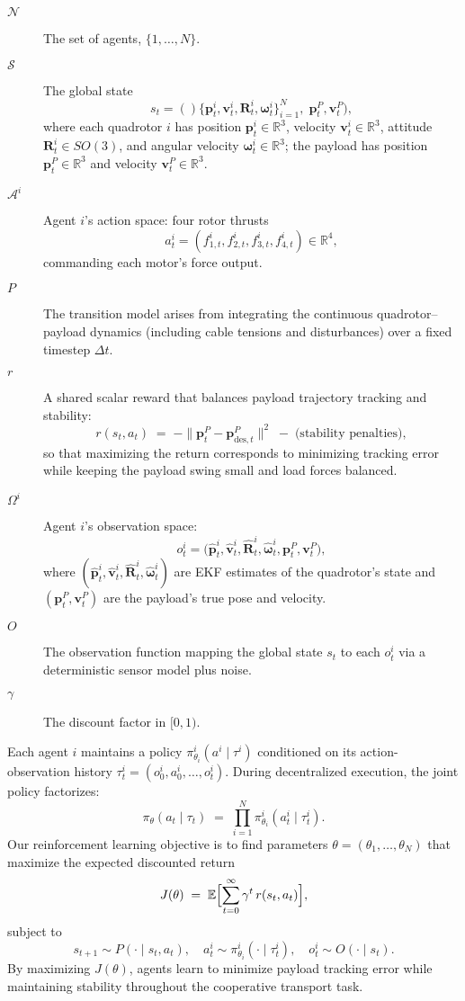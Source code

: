 \begin{description}
  \item[\(\mathcal{N}\)] The set of agents, \(\{1,\dots,N\}\).
  \item[\(\mathcal{S}\)] The global state 
  \[
    s_t = ()\bigl\{\mathbf{p}^i_t,\mathbf{v}^i_t,\mathbf{R}^i_t,\boldsymbol{\omega}^i_t\bigr\}_{i=1}^N,\;\mathbf{p}^P_t,\mathbf{v}^P_t),
  \]
  where each quadrotor \(i\) has position \(\mathbf{p}^i_t\in\mathbb{R}^3\), velocity \(\mathbf{v}^i_t\in\mathbb{R}^3\), attitude \(\mathbf{R}^i_t\in SO(3)\), and angular velocity \(\boldsymbol{\omega}^i_t\in\mathbb{R}^3\); the payload has position \(\mathbf{p}^P_t\in\mathbb{R}^3\) and velocity \(\mathbf{v}^P_t\in\mathbb{R}^3\).
  \item[\(\mathcal{A}^i\)] Agent \(i\)’s action space: four rotor thrusts 
  \[
    a^i_t = (f^i_{1,t},f^i_{2,t},f^i_{3,t},f^i_{4,t}) \in \mathbb{R}^4,
  \]
  commanding each motor’s force output.
  \item[\(P\)] The transition model arises from integrating the continuous quadrotor–payload dynamics (including cable tensions and disturbances) over a fixed timestep \(\Delta t\).
  \item[\(r\)] A shared scalar reward that balances payload trajectory tracking and stability:  
  \[
    r(s_t,a_t) \;=\; -\|\mathbf{p}^P_t - \mathbf{p}^P_{\mathrm{des},t}\|^2 \;-\; \text{(stability penalties)},
  \]
  so that maximizing the return corresponds to minimizing tracking error while keeping the payload swing small and load forces balanced.
  \item[\(\Omega^i\)] Agent \(i\)’s observation space: 
  \[
    o^i_t = \bigl(\hat{\mathbf{p}}^i_t,\hat{\mathbf{v}}^i_t,\hat{\mathbf{R}}^i_t,\hat{\boldsymbol{\omega}}^i_t,\mathbf{p}^P_t,\mathbf{v}^P_t\bigr),
  \]
  where \((\hat{\mathbf{p}}^i_t,\hat{\mathbf{v}}^i_t,\hat{\mathbf{R}}^i_t,\hat{\boldsymbol{\omega}}^i_t)\) are EKF estimates of the quadrotor’s state and \((\mathbf{p}^P_t,\mathbf{v}^P_t)\) are the payload’s true pose and velocity.
  \item[\(O\)] The observation function mapping the global state \(s_t\) to each \(o^i_t\) via a deterministic sensor model plus noise.
  \item[\(\gamma\)] The discount factor in \([0,1)\).
\end{description}

Each agent \(i\) maintains a policy \(\pi^i_{\theta_i}(a^i\mid \tau^i)\) conditioned on its action-observation history \(\tau^i_t=(o^i_0,a^i_0,\dots,o^i_t)\). During decentralized execution, the joint policy factorizes:
\[
\pi_\theta(a_t\mid \tau_t) \;=\; \prod_{i=1}^N \pi^i_{\theta_i}(a^i_t\mid \tau^i_t).
\]
Our reinforcement learning objective is to find parameters \(\theta=(\theta_1,\dots,\theta_N)\) that maximize the expected discounted return
\[
J(\theta) \;=\; \mathbb{E}\Bigl[\sum_{t=0}^\infty \gamma^t\,r(s_t,a_t)\Bigr],
\]
subject to 
\[
s_{t+1}\sim P(\cdot\mid s_t,a_t),\quad a^i_t\sim \pi^i_{\theta_i}(\cdot\mid \tau^i_t),\quad o^i_t\sim O(\cdot\mid s_t).
\]
By maximizing \(J(\theta)\), agents learn to minimize payload tracking error while maintaining stability throughout the cooperative transport task.

